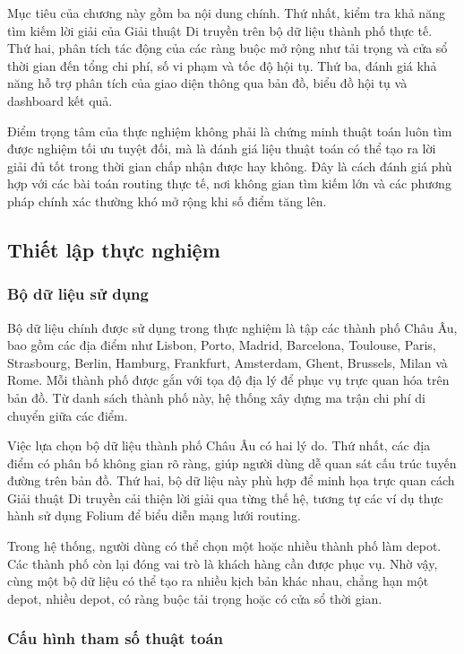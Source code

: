 \documentclass[12pt,a4paper]{article}
\numberwithin{figure}{subsection}
\begin{document}
Mục tiêu của chương này gồm ba nội dung chính. Thứ nhất, kiểm tra khả năng tìm kiếm lời giải của Giải thuật Di truyền trên bộ dữ liệu thành phố thực tế. Thứ hai, phân tích tác động của các ràng buộc mở rộng như tải trọng và cửa sổ thời gian đến tổng chi phí, số vi phạm và tốc độ hội tụ. Thứ ba, đánh giá khả năng hỗ trợ phân tích của giao diện thông qua bản đồ, biểu đồ hội tụ và dashboard kết quả.

Điểm trọng tâm của thực nghiệm không phải là chứng minh thuật toán luôn tìm được nghiệm tối ưu tuyệt đối, mà là đánh giá liệu thuật toán có thể tạo ra lời giải đủ tốt trong thời gian chấp nhận được hay không. Đây là cách đánh giá phù hợp với các bài toán routing thực tế, nơi không gian tìm kiếm lớn và các phương pháp chính xác thường khó mở rộng khi số điểm tăng lên.

\subsection{Thiết lập thực nghiệm}

\subsubsection{Bộ dữ liệu sử dụng}

Bộ dữ liệu chính được sử dụng trong thực nghiệm là tập các thành phố Châu Âu, bao gồm các địa điểm như Lisbon, Porto, Madrid, Barcelona, Toulouse, Paris, Strasbourg, Berlin, Hamburg, Frankfurt, Amsterdam, Ghent, Brussels, Milan và Rome. Mỗi thành phố được gắn với tọa độ địa lý để phục vụ trực quan hóa trên bản đồ. Từ danh sách thành phố này, hệ thống xây dựng ma trận chi phí di chuyển giữa các điểm.

Việc lựa chọn bộ dữ liệu thành phố Châu Âu có hai lý do. Thứ nhất, các địa điểm có phân bố không gian rõ ràng, giúp người dùng dễ quan sát cấu trúc tuyến đường trên bản đồ. Thứ hai, bộ dữ liệu này phù hợp để minh họa trực quan cách Giải thuật Di truyền cải thiện lời giải qua từng thế hệ, tương tự các ví dụ thực hành sử dụng Folium để biểu diễn mạng lưới routing.

Trong hệ thống, người dùng có thể chọn một hoặc nhiều thành phố làm depot. Các thành phố còn lại đóng vai trò là khách hàng cần được phục vụ. Nhờ vậy, cùng một bộ dữ liệu có thể tạo ra nhiều kịch bản khác nhau, chẳng hạn một depot, nhiều depot, có ràng buộc tải trọng hoặc có cửa sổ thời gian.

\subsubsection{Cấu hình tham số thuật toán}
\end{document}

